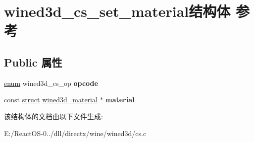 \hypertarget{structwined3d__cs__set__material}{}\section{wined3d\+\_\+cs\+\_\+set\+\_\+material结构体 参考}
\label{structwined3d__cs__set__material}
\subsection*{Public 属性}
\begin{DoxyCompactItemize}
\item 
\mbox{\label{structwined3d__cs__set__material_a2c16ae042734d8ce4884883c5492a260}} 
\hyperlink{interfaceenum}{enum} wined3d\+\_\+cs\+\_\+op {\bfseries opcode}
\item 
\mbox{\label{structwined3d__cs__set__material_addc21e67da7fb6e6b8d2a18e77f990a5}} 
const \hyperlink{interfacestruct}{struct} \hyperlink{structwined3d__material}{wined3d\+\_\+material} $\ast$ {\bfseries material}
\end{DoxyCompactItemize}


该结构体的文档由以下文件生成\+:\begin{DoxyCompactItemize}
\item 
E\+:/\+React\+O\+S-\/0../dll/directx/wine/wined3d/cs.\+c\end{DoxyCompactItemize}

